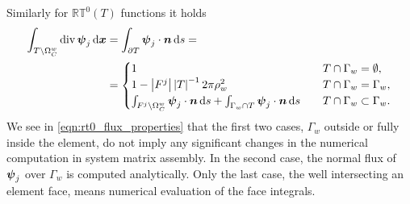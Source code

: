 Similarly for $\mathbb{RT}^0(T)$ functions it holds
\begin{align} \label{eqn:rt0_flux_properties}
    \int_{T\setminus\Omega^w_C} {\rm div}\,\mathbf{\boldsymbol{\psi}}_{j}\,{\rm d}\mathbf{\boldsymbol{x}}
    &= \int_{\partial T} \mathbf{\boldsymbol{\psi}}_{j}\cdot\mathbf{\boldsymbol{n}} \,{\rm d} s = \nonumber\\
    &= \begin{cases}
        1 & \quad T \cap \Gamma_w=\emptyset, \\
        1-\left|F^j\right|\left|T\right|^{-1}2\pi\rho_w^2 & \quad T \cap \Gamma_w=\Gamma_w, \\
        \int_{F^j\setminus \Omega^w_C} \mathbf{\boldsymbol{\psi}}_j\cdot\mathbf{\boldsymbol{n}} \,{\rm d} s
            +\int_{\Gamma_w\cap T} \mathbf{\boldsymbol{\psi}}_j\cdot\mathbf{\boldsymbol{n}} \,{\rm d} s
            &\quad T \cap \Gamma_w\subset\Gamma_w. \\
        \end{cases}
\end{align}
%
We see in \eqref{eqn:rt0_flux_properties} that the first two cases, $\Gamma_w$ outside
or fully inside the element, do not imply any significant changes in the numerical computation
in system matrix assembly. In the second case, the normal flux of $\mathbf{\boldsymbol{\psi}}_j$ over $\Gamma_w$
is computed analytically.
Only the last case, the well intersecting an element face, means
numerical evaluation of the face integrals.

